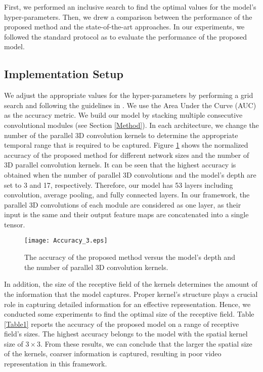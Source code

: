 \documentclass[a4paper,conference]{IEEEtran}
\begin{document}
First, we performed an inclusive search to find the optimal values for the model's hyper-parameters. Then, we drew a comparison between the performance of the proposed method and the state-of-the-art approaches. In our experiments, we followed the standard protocol as \cite{c11,c12} to evaluate the performance of the proposed model. 

\subsection{Implementation Setup}
We adjust the appropriate values for the hyper-parameters by performing a grid search and following the guidelines in \cite{c19}. We use the Area Under the Curve (AUC) as the accuracy metric. We build our model by stacking multiple consecutive convolutional modules (see Section \ref{Method}). In each architecture, we change the number of the parallel 3D convolution kernels to determine the appropriate temporal range that is required to be captured. Figure \ref{Accuracy} shows the normalized accuracy of the proposed method for different network sizes and the number of 3D parallel convolution kernels. It can be seen that the highest accuracy is obtained when the number of parallel 3D convolutions and the model's depth are set to 3 and 17, respectively. Therefore, our model has 53 layers including convolution, average pooling, and fully connected layers. In our framework, the parallel 3D convolutions of each module are considered as one layer, as their input is the same and their output feature maps are concatenated into a single tensor.

\begin{figure}[t]
\begin{center}
	\texttt{[image: Accuracy\_3.eps]}
\end{center}
	\caption{The accuracy of the proposed method versus the model's depth and the number of parallel 3D convolution kernels.}
    \label{Accuracy}
\end{figure}

In addition, the size of the receptive field of the kernels determines the amount of the information that the model captures. Proper kernel's structure plays a crucial role in capturing detailed information for an effective representation. Hence, we conducted some experiments to find the optimal size of the receptive field. Table \ref{Table1} reports the accuracy of the proposed model on a range of receptive field’s sizes. The highest accuracy belongs to the model with the spatial kernel size of $3\times 3$. From these results, we can conclude that the larger the spatial size of the kernels, coarser information is captured, resulting in poor video representation in this framework.
\end{document}
